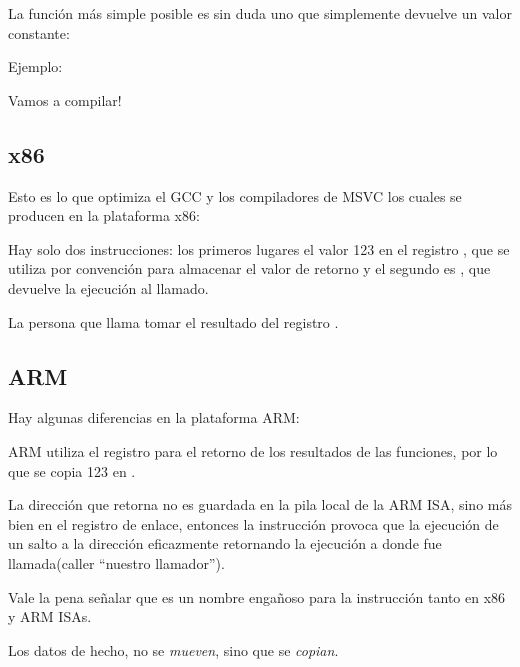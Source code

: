 
La función más simple posible es sin duda uno que simplemente devuelve un valor constante:

Ejemplo:



Vamos a compilar!

\subsection{x86}

Esto es lo que optimiza el GCC  y los compiladores de MSVC los cuales se producen en la plataforma x86:



Hay solo dos instrucciones: los primeros lugares el valor 123 en el registro \EAX, que se utiliza por convención para almacenar el valor de retorno y el segundo es \RET, que devuelve la ejecución al llamado.

La persona que llama tomar el resultado del registro \EAX.

\subsection{ARM}

Hay algunas diferencias en la plataforma ARM:



ARM utiliza el registro  para el retorno de los resultados de las funciones, por lo que se copia 123 en .

La dirección que retorna no es guardada en la pila local de la ARM \ac{ISA}, sino más bien en el registro de enlace,
entonces la instrucción  provoca que la ejecución de un salto a la dirección eficazmente retornando la ejecución a donde fue llamada(caller ``nuestro llamador'').

Vale la pena señalar que \MOV es un nombre engañoso para la instrucción tanto en x86 y ARM \ac{ISA}s.

Los datos de hecho, no se \emph{mueven}, sino que se \emph{copian}.

